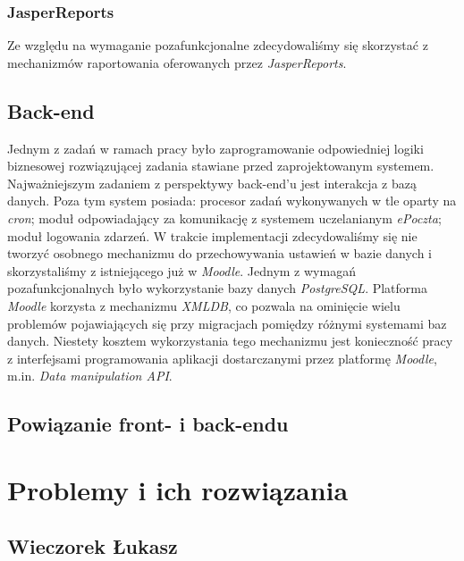\documentclass[12pt]{article}
\begin{document}
\subsubsection{JasperReports}
Ze względu na wymaganie pozafunkcjonalne zdecydowaliśmy się skorzystać z mechanizmów raportowania oferowanych przez \emph{JasperReports}.
\subsection{Back-end}
Jednym z zadań w ramach pracy było zaprogramowanie odpowiedniej logiki biznesowej rozwiązującej zadania stawiane przed zaprojektowanym systemem. Najważniejszym zadaniem z perspektywy back-end'u jest interakcja z bazą danych. Poza tym system posiada: procesor zadań wykonywanych w tle oparty na \emph{cron}; moduł odpowiadający za komunikację z systemem uczelanianym \emph{ePoczta}; moduł logowania zdarzeń. W trakcie implementacji zdecydowaliśmy się nie tworzyć osobnego mechanizmu do przechowywania ustawień w bazie danych i skorzystaliśmy z istniejącego już w \emph{Moodle}. Jednym z wymagań pozafunkcjonalnych było wykorzystanie bazy danych \emph{PostgreSQL}. Platforma \emph{Moodle} korzysta z mechanizmu \emph{XMLDB}, co pozwala na ominięcie wielu problemów pojawiających się przy migracjach pomiędzy różnymi systemami baz danych. Niestety kosztem wykorzystania tego mechanizmu jest konieczność pracy z interfejsami programowania aplikacji dostarczanymi przez platformę \emph{Moodle}, m.in. \emph{Data manipulation API}.
\subsection{Powiązanie front- i back-endu}
\section{Problemy i ich rozwiązania}
\subsection{Wieczorek Łukasz}
\end{document}
